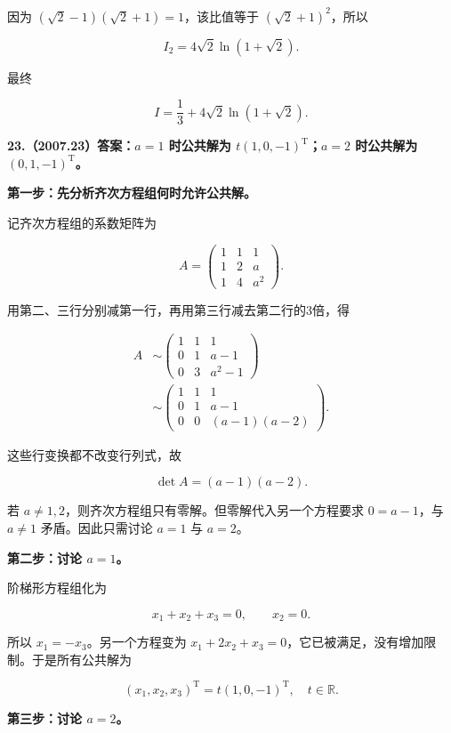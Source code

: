 \documentclass[UTF8,11pt,fontset=windows]{ctexart}
\begin{document}
因为 $(\sqrt2-1)(\sqrt2+1)=1$，该比值等于 $(\sqrt2+1)^2$，所以

$$
I_2=4\sqrt2\ln(1+\sqrt2).
$$

最终

$$
\boxed{I=\frac13+4\sqrt2\ln(1+\sqrt2).}
$$

\clearpage

\textbf{23.（2007.23）答案：$a=1$ 时公共解为 $t(1,0,-1)^{\mathrm T}$；$a=2$ 时公共解为 $(0,1,-1)^{\mathrm T}$。}

\textbf{第一步：先分析齐次方程组何时允许公共解。}

记齐次方程组的系数矩阵为

$$
A=\begin{pmatrix}1&1&1\\1&2&a\\1&4&a^2\end{pmatrix}.
$$

用第二、三行分别减第一行，再用第三行减去第二行的3倍，得

$$
\begin{aligned}
A&\sim\begin{pmatrix}1&1&1\\0&1&a-1\\0&3&a^2-1\end{pmatrix}\\
&\sim\begin{pmatrix}1&1&1\\0&1&a-1\\0&0&(a-1)(a-2)\end{pmatrix}.
\end{aligned}
$$

这些行变换都不改变行列式，故

$$
\det A=(a-1)(a-2).
$$

若 $a\ne1,2$，则齐次方程组只有零解。但零解代入另一个方程要求 $0=a-1$，与 $a\ne1$ 矛盾。因此只需讨论 $a=1$ 与 $a=2$。

\textbf{第二步：讨论 $a=1$。}

阶梯形方程组化为

$$
x_1+x_2+x_3=0,\qquad x_2=0.
$$

所以 $x_1=-x_3$。另一个方程变为 $x_1+2x_2+x_3=0$，它已被满足，没有增加限制。于是所有公共解为

$$
\boxed{(x_1,x_2,x_3)^{\mathrm T}=t(1,0,-1)^{\mathrm T},\quad t\in\mathbb R.}
$$

\textbf{第三步：讨论 $a=2$。}
\end{document}
